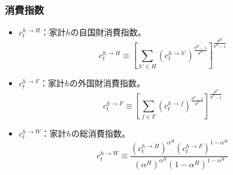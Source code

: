\subsubsection*{消費指数}
\label{sec:model_variables_endogenous_consumption_indices}
\begin{itemize}
    \item
    \label{itm:model_variables_endogenous_consumption_indices_c_h_H}
        \(c_t^{h\to H}\)：家計\(h\)の自国財消費指数。
        \begin{equation}
        \label{form:model_variables_endogenous_consumption_indices_c_h_H_def}
            c_t^{h\to H}\equiv\left[\sum_{h'\in H}(c_t^{h\to h'})^{\frac{\theta^H-1}{\theta^H}}\right]^{\frac{\theta^H}{\theta^H-1}}
        \end{equation}
    \item
    \label{itm:model_variables_endogenous_consumption_indices_c_h_F} \(c_t^{h\to F}\)：家計\(h\)の外国財消費指数。
        \begin{equation}
        \label{form:model_variables_endogenous_consumption_indices_c_h_F_def}
            c_t^{h\to F}\equiv\left[\sum_{f\in F}(c_t^{h\to f})^{\frac{\theta^F-1}{\theta^F}}\right]^{\frac{\theta^F}{\theta^F-1}}
        \end{equation}
    \item
    \label{itm:model_variables_endogenous_consumption_indices_c_h_W}
        \(c_t^{h\to W}\)：家計\(h\)の総消費指数。
        \begin{equation}
        \label{form:model_variables_endogenous_consumption_indices_c_h_W_def}
            c_t^{h\to W}\equiv\frac{(c_t^{h\to H})^{\alpha^H}(c_t^{h\to F})^{1-\alpha^H}}{(\alpha^H)^{\alpha^H}(1-\alpha^H)^{1-\alpha^H}}
        \end{equation}
\end{itemize}
